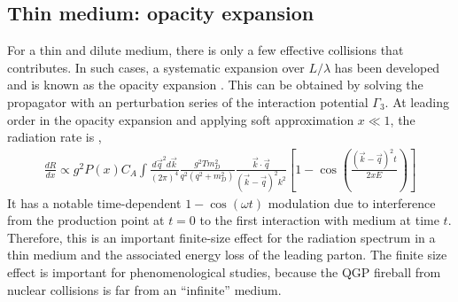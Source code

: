 \subsection{Thin medium: opacity expansion}
For a thin and dilute medium, there is only a few effective collisions that contributes.
In such cases, a systematic expansion over $L/\lambda$ has been developed and is known as the opacity expansion \cite{Wiedemann:2000za,Gyulassy:1999zd,Djordjevic:2008iz}.
This can be obtained by solving the propagator with an perturbation series of the interaction potential $\Gamma_3$.
At leading order in the opacity expansion and applying soft approximation $x\ll 1$, the radiation rate is \cite{Djordjevic:2008iz},
\begin{eqnarray}
\frac{dR}{dx} \propto g^2 P(x) C_A \int \frac{d\vec{q}^2 d\vec{k}}{(2\pi)^4} \frac{g^2 T m_D^2}{q^2(q^2 + m_D^2)} \frac{\vec{k}\cdot\vec{q}}{(\vec{k}-\vec{q})^2 k^2} \left[1-\cos\left(\frac{(\vec{k}-\vec{q})^2 t}{2x E}\right)\right]
\end{eqnarray}
It has a notable time-dependent $1-\cos(\omega t)$ modulation due to interference from the production point at $t=0$ to the first interaction with medium at time $t$.
Therefore, this is an important finite-size effect for the radiation spectrum in a thin medium and the associated energy loss of the leading parton.
The finite size effect is important for phenomenological studies, because the QGP fireball from nuclear collisions is far from an ``infinite'' medium.

